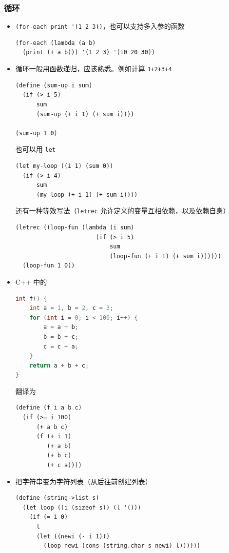 \subsubsection{循环}
\begin{itemize}
\item \verb`(for-each print '(1 2 3))`，也可以支持多入参的函数
\begin{lstlisting}[language=none]
(for-each (lambda (a b)
  (print (+ a b))) '(1 2 3) '(10 20 30))
\end{lstlisting}
\item 循环一般用函数递归，应该熟悉。例如计算 \verb`1+2+3+4`
\begin{lstlisting}[language=none]
(define (sum-up i sum)
  (if (> i 5)
      sum
      (sum-up (+ i 1) (+ sum i))))

(sum-up 1 0)
\end{lstlisting}
也可以用 \verb`let`
\begin{lstlisting}[language=none]
(let my-loop ((i 1) (sum 0))
  (if (> i 4)
      sum
      (my-loop (+ i 1) (+ sum i))))
\end{lstlisting}
还有一种等效写法（\verb`letrec` 允许定义的变量互相依赖，以及依赖自身）
\begin{lstlisting}[language=none]
(letrec ((loop-fun (lambda (i sum)
                       (if (> i 5)
                           sum
                           (loop-fun (+ i 1) (+ sum i))))))
  (loop-fun 1 0))
\end{lstlisting}

\item C++ 中的
\begin{lstlisting}[language=cpp]
int f() {
    int a = 1, b = 2, c = 3;
    for (int i = 0; i < 100; i++) {
        a = a + b;
        b = b + c;
        c = c + a;
    }
    return a + b + c;
}
\end{lstlisting}
翻译为
\begin{lstlisting}[language=none]
(define (f i a b c)
  (if (>= i 100)
      (+ a b c)
      (f (+ i 1)
         (+ a b)
         (+ b c)
         (+ c a))))
\end{lstlisting}

\item 把字符串变为字符列表（从后往前创建列表）
\begin{lstlisting}[language=none]
(define (string->list s)
  (let loop ((i (sizeof s)) (l '()))
    (if (= i 0)
	  l
	  (let ((newi (- i 1)))
	    (loop newi (cons (string.char s newi) l))))))
\end{lstlisting}
\end{itemize}


